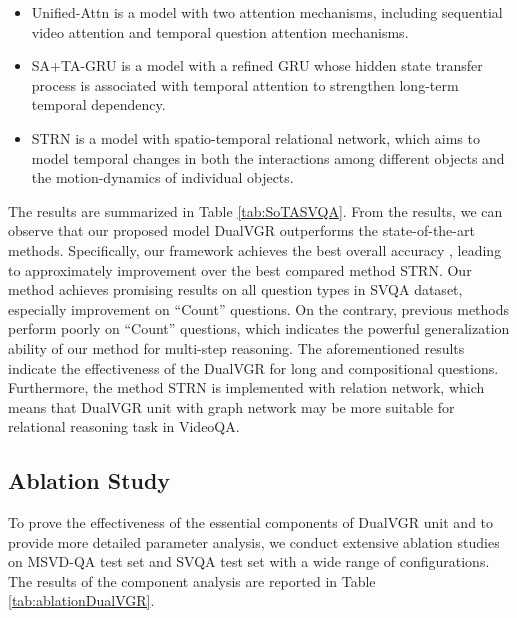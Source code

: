 \documentclass[journal]{IEEEtran}
\begin{document}
\begin{itemize}
    \item Unified-Attn \cite{xue2017unifying} is a model with two attention mechanisms, including sequential video attention and temporal question attention mechanisms. 
    \item SA+TA-GRU \cite{song2018explore} is a model with a refined GRU whose hidden state transfer process is associated with temporal attention to strengthen long-term temporal dependency.
    \item STRN \cite{singh2019spatio} is a model with spatio-temporal relational network, which aims to model temporal changes in both the interactions among different objects and the motion-dynamics of individual objects.
\end{itemize}

The results are summarized in Table \ref{tab:SoTASVQA}. From the results, we can observe that our proposed model DualVGR outperforms the state-of-the-art methods. Specifically, our framework achieves the best overall accuracy , leading to approximately  improvement over the best compared method STRN. Our method achieves promising results on all question types in SVQA dataset, especially  improvement on ``Count'' questions. On the contrary, previous methods perform poorly on ``Count'' questions, which indicates the powerful generalization ability of our method for multi-step reasoning. The aforementioned results indicate the effectiveness of the DualVGR for long and compositional questions. Furthermore, the method STRN is implemented with relation network, which means that DualVGR unit with graph network may be more suitable for relational reasoning task in VideoQA. 
\subsection{Ablation Study}
To prove the effectiveness of the essential components of DualVGR unit and to provide more detailed parameter analysis, we conduct extensive ablation studies on MSVD-QA test set and SVQA test set with a wide range of configurations. The results of the component analysis are reported in Table \ref{tab:ablationDualVGR}.
\end{document}
